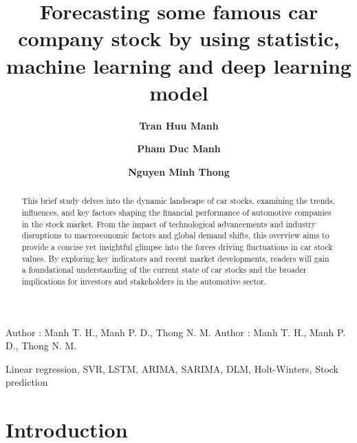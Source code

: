 \documentclass{ieeeojies}
\begin{document}
\title{Forecasting some famous car company stock by using statistic, machine learning and deep learning model}


\author[1]{\large\textbf{Tran Huu Manh}}
\author[2]{\large\textbf{Pham Duc Manh}}
\author[3]{\large\textbf{Nguyen Minh Thong}}
\setcounter{Maxaffil}{0}
\renewcommand\Affilfont{\itshape\small}

\markboth
{Author \headeretal: Manh T. H., Manh P. D., Thong N. M.}
{Author \headeretal: Manh T. H., Manh P. D., Thong N. M.}

\begin{abstract}
This brief study delves into the dynamic landscape of car stocks, examining the trends, influences, and key factors shaping the financial performance of automotive companies in the stock market. From the impact of technological advancements and industry disruptions to macroeconomic factors and global demand shifts, this overview aims to provide a concise yet insightful glimpse into the forces driving fluctuations in car stock values. By exploring key indicators and recent market developments, readers will gain a foundational understanding of the current state of car stocks and the broader implications for investors and stakeholders in the automotive sector.
\end{abstract}

\begin{keywords}
Linear regression, SVR, LSTM, ARIMA, SARIMA, DLM, Holt-Winters, Stock prediction
\end{keywords}

\titlepgskip=-15pt

\maketitle

\section{Introduction}
\end{document}
